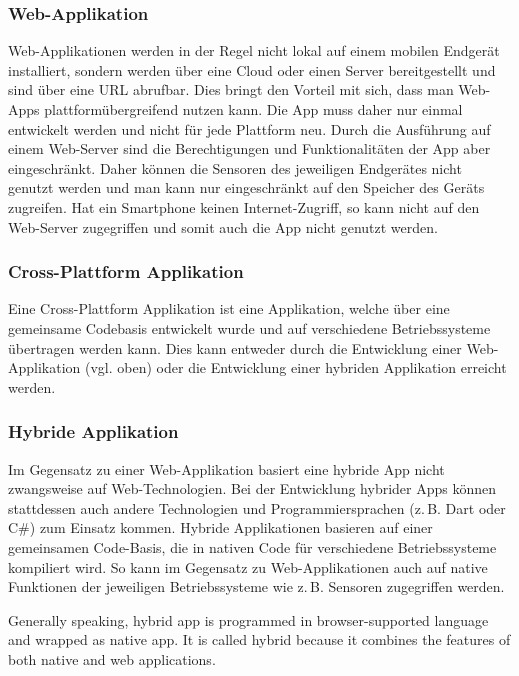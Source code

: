 \documentclass[]{lni}
\begin{document}
\subsubsection*{Web-Applikation} 
Web-Applikationen werden in der Regel nicht lokal auf einem mobilen Endgerät installiert, sondern werden über eine Cloud oder einen Server bereitgestellt und sind über eine URL abrufbar. Dies bringt den Vorteil mit sich, dass man Web-Apps plattformübergreifend nutzen kann. Die App muss daher nur einmal entwickelt werden und nicht für jede Plattform neu. Durch die Ausführung auf einem Web-Server sind die Berechtigungen und Funktionalitäten der App aber eingeschränkt. Daher können die Sensoren des jeweiligen Endgerätes nicht genutzt werden und man kann nur eingeschränkt auf den Speicher des Geräts zugreifen. Hat ein Smartphone keinen Internet-Zugriff, so kann nicht auf den Web-Server zugegriffen und somit auch die App nicht genutzt werden.

\subsubsection*{Cross-Plattform Applikation}
Eine Cross-Plattform Applikation ist eine Applikation, welche über eine gemeinsame Codebasis entwickelt wurde und auf verschiedene Betriebssysteme übertragen werden kann. Dies kann entweder durch die Entwicklung einer Web-Applikation (vgl. oben) oder die Entwicklung einer hybriden Applikation erreicht werden.

\subsubsection*{Hybride Applikation}
Im Gegensatz zu einer Web-Applikation basiert eine hybride App nicht zwangsweise auf Web-Technologien. Bei der Entwicklung hybrider Apps können stattdessen auch andere Technologien und Programmiersprachen (z.\,B. Dart oder C\#) zum Einsatz kommen. Hybride Applikationen basieren auf einer gemeinsamen Code-Basis, die in nativen Code für verschiedene Betriebssysteme kompiliert wird. So kann im Gegensatz zu Web-Applikationen auch auf native Funktionen der jeweiligen Betriebssysteme wie z.\,B. Sensoren zugegriffen werden.
\begin{displayquote}
    \glqq Generally speaking, hybrid app is programmed in browser-supported language and wrapped as native app. It is called hybrid because it combines the features of both native and web applications.\grqq\:\cite{Denko.2021}
\end{displayquote}
\end{document}
